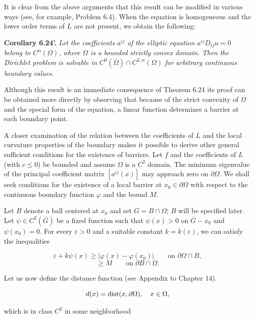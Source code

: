 \medskip

It is clear from the above arguments that this result can be modified in various ways (see, for example, Problem 6.4). When the equation is homogeneous and the lower order terms of $L$ are not present, we obtain the following:

\medskip

\noindent\textbf{Corollary 6.24'.} \textit{Let the coefficients $a^{ij}$ of the elliptic equation $a^{ij}D_{ij}u=0$ belong to $C^\alpha(\Omega)$, where $\Omega$ is a bounded strictly convex domain. Then the Dirichlet problem is solvable in $C^0(\overline{\Omega})\cap C^{2,\alpha}(\Omega)$ for arbitrary continuous boundary values.}

\medskip

Although this result is an immediate consequence of Theorem 6.24 its proof can be obtained more directly by observing that because of the strict convexity of $\Omega$ and the special form of the equation, a linear function determines a barrier at each boundary point.

A closer examination of the relation between the coefficients of $L$ and the local curvature properties of the boundary makes it possible to derive other general sufficient conditions for the existence of barriers. Let $f$ and the coefficients of $L$ (with $c\leq 0$) be bounded and assume $\Omega$ is a $C^2$ domain. The minimum eigenvalue of the principal coefficient matrix $[a^{ij}(x)]$ may approach zero on $\partial\Omega$. We shall seek conditions for the existence of a local barrier at $x_0\in \partial\Omega$ with respect to the continuous boundary function $\varphi$ and the bound $M$.

Let $B$ denote a ball centered at $x_0$ and set $G=B\cap\Omega$; $B$ will be specified later.
Let $\psi\in C^2(\overline{G})$ be a fixed function such that $\psi(x)>0$ on $\overline{G}-x_0$ and $\psi(x_0)=0$.
For every $\varepsilon>0$ and a suitable constant $k=k(\varepsilon)$, we can satisfy the inequalities

\[
\varepsilon + k\psi(x) \geq |\varphi(x)-\varphi(x_0)| \qquad \text{on } \partial\Omega\cap B,
\]
\[
\geq M \qquad \text{on } \partial B\cap \Omega.
\]

Let us now define the distance function (see Appendix to Chapter 14).

\[
d(x)=\operatorname{dist}(x,\partial\Omega), \quad x\in\Omega,
\]


which is in class $C^2$ in some neighborhood

